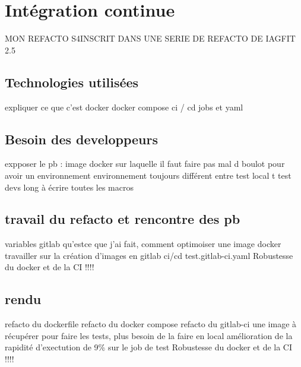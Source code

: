 \section{Intégration continue}
MON REFACTO S4INSCRIT DANS UNE SERIE DE REFACTO DE IAGFIT 2.5
\subsection{Technologies utilisées}
expliquer ce que c'est
                    docker
                    docker compose
                    ci / cd
                    jobs et yaml

\subsection{Besoin des developpeurs}
expposer le pb : image docker sur laquelle il faut faire pas mal d boulot pour avoir un environnement
                    environnement toujours différent entre test local t test devs
                    long à écrire toutes les macros

\subsection{travail du refacto et rencontre des pb}
variables gitlab
qu'estce que j'ai fait, comment optimoiser une image docker
travailler sur la création d'images en gitlab ci/cd test.gitlab-ci.yaml
Robustesse du docker et de la CI !!!!

\subsection{rendu}
refacto du dockerfile
refacto du docker compose
refacto du gitlab-ci
    une image à récupérer pour faire les tests, plus besoin de la faire en local
    amélioration de la rapidité d'exectution de 9\% sur le job de test
    Robustesse du docker et de la CI !!!!
